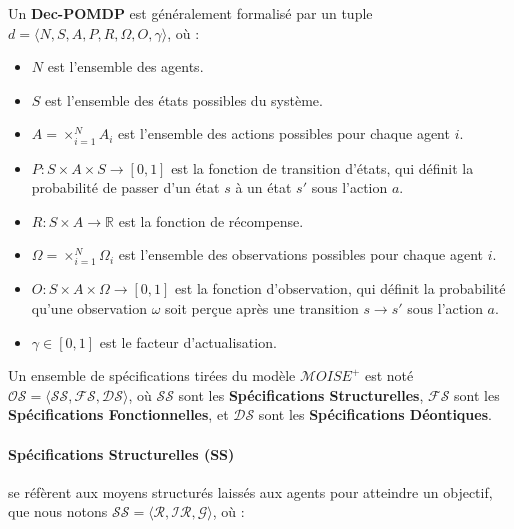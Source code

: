 \documentclass[sigconf,anonymous]{aamas}
\begin{document}
Un \textbf{Dec-POMDP} est généralement formalisé par un tuple $d = \langle N, S, A, P, R, \Omega, O, \gamma \rangle$, où :
\begin{itemize}
    \item \( N \) est l'ensemble des agents.
    \item \( S \) est l'ensemble des états possibles du système.
    \item \( A = \times_{i=1}^N A_i \) est l'ensemble des actions possibles pour chaque agent \(i\).
    \item \( P : S \times A \times S \to [0, 1] \) est la fonction de transition d'états, qui définit la probabilité de passer d'un état \(s\) à un état \(s'\) sous l'action \(a\).
    \item \( R : S \times A \to \mathbb{R} \) est la fonction de récompense.
    \item \( \Omega = \times_{i=1}^N \Omega_i \) est l'ensemble des observations possibles pour chaque agent \(i\).
    \item \( O : S \times A \times \Omega \to [0, 1] \) est la fonction d'observation, qui définit la probabilité qu'une observation \(\omega\) soit perçue après une transition \(s \to s'\) sous l'action \(a\).
    \item \( \gamma \in [0, 1] \) est le facteur d'actualisation.
\end{itemize}

Un ensemble de spécifications tirées du modèle $\mathcal{M}OISE^+$ est noté $\mathcal{OS} = \langle \mathcal{SS}, \mathcal{FS}, \mathcal{DS} \rangle$, où $\mathcal{SS}$ sont les \textbf{Spécifications Structurelles}, $\mathcal{FS}$ sont les \textbf{Spécifications Fonctionnelles}, et $\mathcal{DS}$ sont les \textbf{Spécifications Déontiques}.

\paragraph{\textbf{Spécifications Structurelles (SS)}} se réfèrent aux moyens structurés laissés aux agents pour atteindre un objectif, que nous notons $\mathcal{SS} = \langle \mathcal{R}, \mathcal{IR}, \mathcal{G} \rangle$, où :
\end{document}
